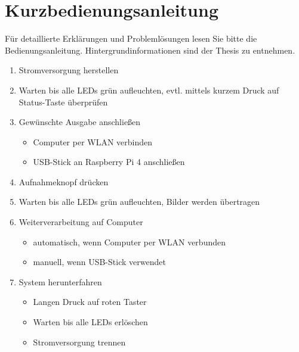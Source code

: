 \documentclass[./00PhotoBox.tex]{subfiles}
\begin{document}
\chapter{Kurzbedienungsanleitung}

Für detaillierte Erklärungen und Problemlösungen lesen Sie bitte die Bedienungsanleitung. Hintergrundinformationen sind der Thesis zu entnehmen.


\begin{enumerate}
    \item Stromversorgung herstellen
    \item Warten bis alle LEDs grün aufleuchten, evtl. mittels kurzem Druck auf Status-Taste überprüfen
    \item Gewünschte Ausgabe anschließen
          \begin{itemize}
              \item Computer per WLAN verbinden
              \item USB-Stick an Raspberry Pi 4 anschließen
          \end{itemize}
    \item Aufnahmeknopf drücken
    \item Warten bis alle LEDs grün aufleuchten, Bilder werden übertragen
    \item Weiterverarbeitung auf Computer
          \begin{itemize}
              \item automatisch, wenn Computer per WLAN verbunden
              \item manuell, wenn USB-Stick verwendet
          \end{itemize}
    \item System herunterfahren
          \begin{itemize}
              \item Langen Druck auf roten Taster
              \item Warten bis alle LEDs erlöschen
              \item Stromversorgung trennen
          \end{itemize}
\end{enumerate}

\biblio
\end{document}
